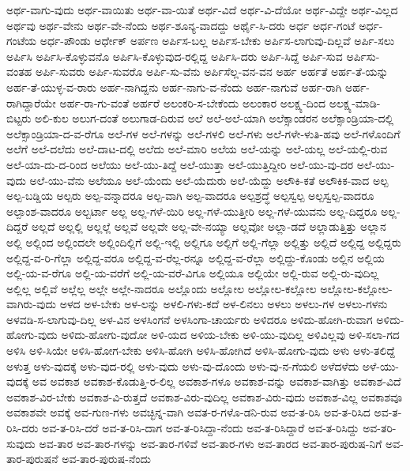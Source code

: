 {ಅರ್ಥ-ವಾಗು-ವುದು
ಅರ್ಥ-ವಾಯಿತು
ಅರ್ಥ-ವಾ-ಯಿತೆ
ಅರ್ಥ-ವಿದೆ
ಅರ್ಥ-ವಿ-ದೆಯೋ
ಅರ್ಥ-ವಿದ್ದೇ
ಅರ್ಥ-ವಿಲ್ಲದ
ಅರ್ಥವು
ಅರ್ಥ-ವೇನು
ಅರ್ಥ-ವೇ-ನೆಂದು
ಅರ್ಥ-ಶೂನ್ಯ-ವಾದದ್ದು
ಅರ್ಥೈ-ಸಿ-ದರು
ಅರ್ಧ
ಅರ್ಧ-ಗಂಟೆ
ಅರ್ಧ-ಗಂಟೆಯ
ಅರ್ಧ-ಪೌಂಡು
ಅರ್ಧೇಕ್
ಅರ್ಪಣ
ಅರ್ಪಿಸ-ಬಲ್ಲ
ಅರ್ಪಿಸ-ಬೇಕು
ಅರ್ಪಿಸ-ಲಾಗುವು-ದಿಲ್ಲವೆ
ಅರ್ಪಿ-ಸಲು
ಅರ್ಪಿಸಿ
ಅರ್ಪಿಸಿ-ಕೊಳ್ಳುವನೊ
ಅರ್ಪಿಸಿ-ಕೊಳ್ಳುವುದ-ರಲ್ಲಿದ್ದ
ಅರ್ಪಿಸಿ-ದರು
ಅರ್ಪಿ-ಸಿದ್ದೆ
ಅರ್ಪಿ-ಸುವ
ಅರ್ಪಿಸು-ವಂತಹ
ಅರ್ಪಿ-ಸುವರು
ಅರ್ಪಿ-ಸುವರೊ
ಅರ್ಪಿ-ಸು-ವೆನು
ಅರ್ಪಿಸೆಲ್ಲ-ವನ-ವನ
ಅರ್ಹ
ಅರ್ಹತೆ
ಅರ್ಹ-ತೆ-ಯನ್ನು
ಅರ್ಹ-ತೆ-ಯುಳ್ಳ-ವ-ರಾರು
ಅರ್ಹ-ನಾಗಿದ್ದನು
ಅರ್ಹ-ನಾಗು-ವ-ನೆಂದು
ಅರ್ಹ-ನಾಗುವೆ
ಅರ್ಹ-ರಾಗಿ
ಅರ್ಹ-ರಾಗಿದ್ದಾರೆಯೇ
ಅರ್ಹ-ರಾ-ಗು-ವಂತೆ
ಅರ್ಹರೆ
ಅಲಂಕರಿ-ಸ-ಬೇಕೆಂದು
ಅಲಂಕಾರ
ಅಲಕ್ಷ್ಯ-ದಿಂದ
ಅಲಕ್ಷ್ಯ-ಮಾಡಿ-ಬಿಟ್ಟರು
ಅಲಿ-ಕುಲ
ಅಲುಗ-ದಂತೆ
ಅಲುಗಾಡ-ದಿರುವ
ಅಲೆ
ಅಲೆ-ಅಲೆ-ಯಾಗಿ
ಅಲೆಕ್ಸಾಂಡರನ
ಅಲೆಕ್ಸಾಂಡ್ರಿಯಾ-ದಲ್ಲಿ
ಅಲೆಕ್ಸಾಂಡ್ರಿಯಾ-ದ-ವ-ರೆಗೂ
ಅಲೆ-ಗಳ
ಅಲೆ-ಗಳನ್ನು
ಅಲೆ-ಗಳಲಿ
ಅಲೆ-ಗಳು
ಅಲೆ-ಗಳೇ-ಳುತಿ-ಹವು
ಅಲೆ-ಗಳೊಂದಿಗೆ
ಅಲೆಗೆ
ಅಲೆ-ದಲೆದು
ಅಲೆ-ದಾಟ-ದಲ್ಲಿ
ಅಲೆದು
ಅಲೆ-ಮಾರಿ
ಅಲೆಯ
ಅಲೆ-ಯನ್ನು
ಅಲೆ-ಯಲ್ಲ
ಅಲೆ-ಯಲ್ಲಿ-ರುವ
ಅಲೆ-ಯಾ-ದು-ದ-ರಿಂದ
ಅಲೆಯು
ಅಲೆ-ಯು-ತಿದ್ದೆ
ಅಲೆ-ಯುತ್ತಾ
ಅಲೆ-ಯುತ್ತಿದ್ದೀರಿ
ಅಲೆ-ಯು-ವು-ದರ
ಅಲೆ-ಯು-ವುದು
ಅಲೆ-ಯು-ವೆನು
ಅಲೆಯೂ
ಅಲೆ-ಯೆಂದು
ಅಲೆ-ಯೆದುರು
ಅಲೆ-ಯೆದ್ದು
ಅಲೌಕಿ-ಕತೆ
ಅಲೌಕಿಕ-ವಾದ
ಅಲ್ಪ
ಅಲ್ಪ-ಬಡ್ಡಿಯ
ಅಲ್ಪರು
ಅಲ್ಪ-ವನ್ನಾದರೂ
ಅಲ್ಪ-ವಾಗಿ
ಅಲ್ಪ-ವಾದರೂ
ಅಲ್ಪಶ್ರದ್ಧೆ
ಅಲ್ಪಸ್ವಲ್ಪ
ಅಲ್ಪಸ್ವಲ್ಪ-ವಾದರೂ
ಅಲ್ಪಾಂಶ-ವಾದರೂ
ಅಲ್ಬರ್ಟಾ
ಅಲ್ಲ
ಅಲ್ಲ-ಗಳೆ-ಯಿರಿ
ಅಲ್ಲ-ಗಳೆ-ಯುತ್ತೀರಿ
ಅಲ್ಲ-ಗಳೆ-ಯುವನು
ಅಲ್ಲ-ದಿದ್ದರೂ
ಅಲ್ಲ-ದಿದ್ದರೆ
ಅಲ್ಲದೆ
ಅಲ್ಲಲ್ಲಿ
ಅಲ್ಲಲ್ಲೆ
ಅಲ್ಲವೆ
ಅಲ್ಲವೇ
ಅಲ್ಲ-ವೇ-ನಯ್ಯಾ
ಅಲ್ಲವೋ
ಅಲ್ಲಾ-ಡದೆ
ಅಲ್ಲಾಡುತ್ತಿತ್ತು
ಅಲ್ಲಾನ
ಅಲ್ಲಿ
ಅಲ್ಲಿಂದ
ಅಲ್ಲಿಂದಲೇ
ಅಲ್ಲಿಂದಿಲ್ಲಿಗೆ
ಅಲ್ಲಿ-ಇಲ್ಲಿ
ಅಲ್ಲಿಗೂ
ಅಲ್ಲಿಗೆ
ಅಲ್ಲಿ-ಗೆಲ್ಲಾ
ಅಲ್ಲಿತ್ತು
ಅಲ್ಲಿದೆ
ಅಲ್ಲಿದ್ದ
ಅಲ್ಲಿದ್ದರು
ಅಲ್ಲಿದ್ದ-ವ-ರಿ-ಗೆಲ್ಲಾ
ಅಲ್ಲಿದ್ದ-ವರೂ
ಅಲ್ಲಿದ್ದ-ವ-ರೆಲ್ಲ-ರನ್ನೂ
ಅಲ್ಲಿದ್ದ-ವ-ರೆಲ್ಲಾ
ಅಲ್ಲಿದ್ದು-ಕೊಂಡು
ಅಲ್ಲಿನ
ಅಲ್ಲಿಯ
ಅಲ್ಲಿ-ಯ-ವ-ರೆಗೂ
ಅಲ್ಲಿ-ಯ-ವರೆಗೆ
ಅಲ್ಲಿ-ಯ-ವರೆ-ವಿಗೂ
ಅಲ್ಲಿಯೂ
ಅಲ್ಲಿಯೇ
ಅಲ್ಲಿ-ರುವ
ಅಲ್ಲಿ-ರು-ವುದಿಲ್ಲ
ಅಲ್ಲಿಲ್ಲ
ಅಲ್ಲಿವೆ
ಅಲ್ಲೆಲ್ಲ
ಅಲ್ಲೇ
ಅಲ್ಲೇ-ನಾದರೂ
ಅಲ್ಲೊಂದು
ಅಲ್ಲೋಲ
ಅಲ್ಲೋಲ-ಕಲ್ಲೋಲ
ಅಲ್ಲೋಲ-ಕಲ್ಲೋಲ-ವಾಗಿರು-ವುದು
ಅಳದ
ಅಳ-ಬೇಕು
ಅಳ-ಲನ್ನು
ಅಳಲಿ-ಗಳು-ಕದೆ
ಅಳ-ಲಿನಲು
ಅಳಲು
ಅಳಲು-ಗಳ
ಅಳಲು-ಗಳನು
ಅಳವಡಿ-ಸ-ಲಾಗುವು-ದಿಲ್ಲ
ಅಳ-ವಿನ
ಅಳಸಿಂಗನೆ
ಅಳಸಿಂಗಾ-ಚಾರ್ಯರು
ಅಳಿದರೂ
ಅಳಿದು-ಹೋಗಿ-ರುವಾಗ
ಅಳಿದು-ಹೋಗು-ವುದು
ಅಳಿದು-ಹೋಗು-ವುದೋ
ಅಳಿ-ಯದ
ಅಳಿಯ-ಬೇಕು
ಅಳಿ-ಯು-ವುದಿಲ್ಲ
ಅಳಿವಿಲ್ಲವು
ಅಳಿ-ಸಲಾ-ಗದ
ಅಳಿಸಿ
ಅಳಿ-ಸಿಯೇ
ಅಳಿಸಿ-ಹೋಗ-ಬೇಕು
ಅಳಿಸಿ-ಹೋಗಿ
ಅಳಿಸಿ-ಹೋಗಿದೆ
ಅಳಿಸಿ-ಹೋಗು-ವುದು
ಅಳು
ಅಳು-ತಲಿದ್ದೆ
ಅಳುತ್ತ
ಅಳು-ವುದಕ್ಕೆ
ಅಳು-ವುದ-ರಲ್ಲಿ
ಅಳು-ವುದು
ಅಳು-ವು-ದೊಂದು
ಅಳು-ವು-ನ-ಗೆಯಲಿ
ಅಳೆದಳೆದು
ಅಳೆ-ಯು-ವುದಕ್ಕೆ
ಅವ
ಅವಕಾಶ
ಅವಕಾಶ-ಕೊಡುತ್ತಿ-ರ-ಲಿಲ್ಲ
ಅವಕಾಶ-ಗಳೂ
ಅವಕಾಶ-ವನ್ನು
ಅವಕಾಶ-ವಾಗಿತ್ತು
ಅವಕಾಶ-ವಿದೆ
ಅವಕಾಶ-ವಿರ-ಬೇಕು
ಅವಕಾಶ-ವಿ-ರುತ್ತದೆ
ಅವಕಾಶ-ವಿರು-ವುದಿಲ್ಲ
ಅವಕಾಶ-ವಿರು-ವುದು
ಅವಕಾಶ-ವಿಲ್ಲ
ಅವಕಾಶವೂ
ಅವಕಾಶವೇ
ಅವಕ್ಕೆ
ಅವ-ಗುಣ-ಗಳು
ಅವಚ್ಛಿನ್ನ-ವಾಗಿ
ಅವತ-ರ-ಗಳೊ-ಡನಿ-ರುವ
ಅವ-ತ-ರಿಸಿ
ಅವ-ತ-ರಿಸಿದ
ಅವ-ತ-ರಿಸಿ-ದರು
ಅವ-ತ-ರಿಸಿ-ದರೆ
ಅವ-ತ-ರಿಸಿ-ದಾಗ
ಅವ-ತ-ರಿಸಿದ್ದಾ-ನೆಂದು
ಅವ-ತ-ರಿಸಿದ್ದಾರೆ
ಅವ-ತ-ರಿಸಿದ್ದು
ಅವ-ತರಿ-ಸುವುದು
ಅವ-ತಾರ
ಅವ-ತಾರ-ಗಳನ್ನು
ಅವ-ತಾರ-ಗಳಿವೆ
ಅವ-ತಾರ-ಗಳು
ಅವ-ತಾರದ
ಅವ-ತಾರ-ಪುರುಷ-ನಿಗೆ
ಅವ-ತಾರ-ಪುರುಷನೆ
ಅವ-ತಾರ-ಪುರುಷ-ನೆಂದು
}
